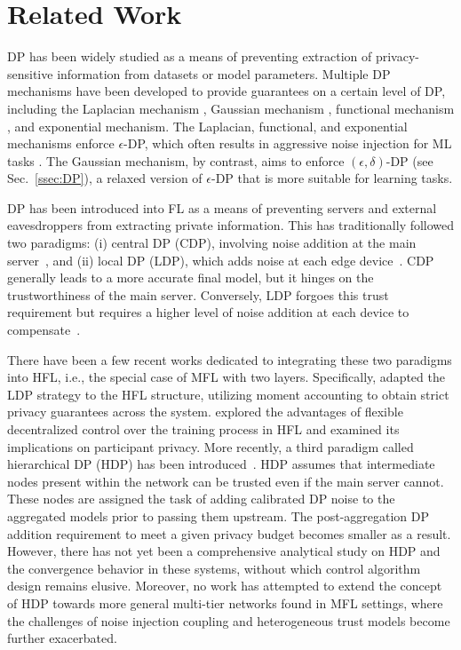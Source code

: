 \section{Related Work}
DP has been widely studied as a means of preventing extraction of privacy-sensitive information from datasets or model parameters. Multiple DP mechanisms have been developed to provide guarantees on a certain level of DP, including the Laplacian mechanism \cite{dwork2006calibrating}, Gaussian mechanism \cite{Dwork2014DP}, functional mechanism \cite{zhang2012functional}, and exponential mechanism\cite{mcsherry2007mechanism}. 
The Laplacian, functional, and exponential mechanisms enforce $\epsilon$-DP, which often results in aggressive noise injection for ML tasks \cite{pan2024differential}. The Gaussian mechanism, by contrast, aims to enforce $(\epsilon,\delta)$-DP (see Sec.~\ref{ssec:DP}), a relaxed version of $\epsilon$-DP that is more suitable for learning tasks.


DP has been introduced into FL as a means of preventing servers and external eavesdroppers from extracting private information.
This has traditionally followed two paradigms: (i) central DP (CDP), involving noise addition at the main server~\cite{kon2017federated,Xiong2022CDP}, and (ii) local DP (LDP), which adds noise at each edge device~\cite{Zhao2021LDP,Shen2022imp,mobi2023Qiao,Liu2023mobi}. 
CDP generally leads to a more accurate final model, but it hinges on the trustworthiness of the main server. Conversely, LDP forgoes this trust requirement but requires a higher level of noise addition at each device to compensate~\cite{naseri2022local}.

There have been a few recent works dedicated to integrating these two paradigms into HFL, i.e., the special case of MFL with two layers. Specifically, \cite{Shi2021HDP,Zhou2023HDL} adapted the LDP strategy to the HFL structure, utilizing moment accounting to obtain strict privacy guarantees across the system. \cite{Wainakh2020HLDP} explored the advantages of flexible decentralized control over the training process in HFL and examined its implications on participant privacy. 
More recently, a third paradigm called hierarchical DP (HDP) has been introduced~\cite{chandrasekaran2022HDP}. 
HDP assumes that intermediate nodes present within the network can be trusted even if the main server cannot. These nodes are assigned the task of adding calibrated DP noise to the aggregated models prior to passing them upstream. The post-aggregation DP addition requirement to meet a given privacy budget becomes smaller as a result. However, there has not yet been a comprehensive analytical study on HDP and the convergence behavior in these systems, without which control algorithm design remains elusive. Moreover, no work has attempted to extend the concept of HDP towards more general multi-tier networks found in MFL settings, where the challenges of noise injection coupling and heterogeneous trust models become further exacerbated.